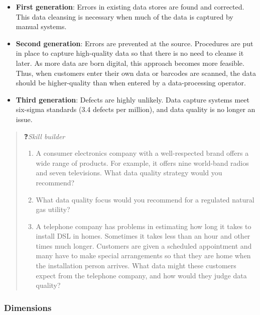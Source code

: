 \documentclass[
]{article}
\begin{document}
\begin{itemize}
\item
  \textbf{First generation}: Errors in existing data stores are found and
  corrected. This data cleansing is necessary when much of the data is
  captured by manual systems.
\item
  \textbf{Second generation}: Errors are prevented at the source.
  Procedures are put in place to capture high-quality data so that
  there is no need to cleanse it later. As more data are born digital,
  this approach becomes more feasible. Thus, when customers enter
  their own data or barcodes are scanned, the data should be
  higher-quality than when entered by a data-processing operator.
\item
  \textbf{Third generation}: Defects are highly unlikely. Data capture
  systems meet six-sigma standards (3.4 defects per million), and data
  quality is no longer an issue.
\end{itemize}

\begin{quote}
❓\emph{Skill builder}

\begin{enumerate}
\def\labelenumi{\arabic{enumi}.}
\item
  A consumer electronics company with a well-respected brand offers
  a wide range of products. For example, it offers nine world-band
  radios and seven televisions. What data quality strategy would you
  recommend?
\item
  What data quality focus would you recommend for a regulated
  natural gas utility?
\item
  A telephone company has problems in estimating how long it takes
  to install DSL in homes. Sometimes it takes less than an hour and
  other times much longer. Customers are given a scheduled
  appointment and many have to make special arrangements so that
  they are home when the installation person arrives. What data
  might these customers\\
  expect from the telephone company, and how would they judge data
  quality?
\end{enumerate}
\end{quote}

\hypertarget{dimensions}{%
\subsubsection*{Dimensions}\label{dimensions}}
\end{document}
